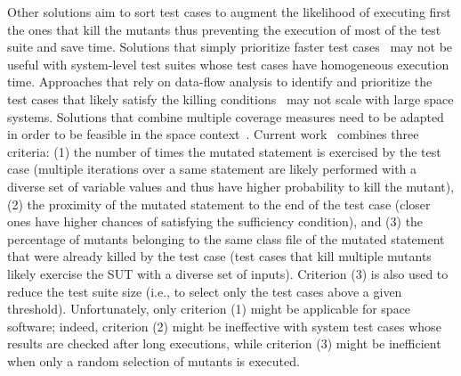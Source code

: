 Other solutions aim to sort test cases to augment the likelihood of executing first the ones that kill the mutants thus preventing the execution of most of the test suite and save time.
Solutions that simply prioritize faster test cases~\cite{just2012using}
 may not be useful with system-level test suites whose test cases have homogeneous execution time.
Approaches that rely on data-flow analysis to identify and prioritize the test cases that likely satisfy the killing conditions~\cite{papadakis2011automatically} may not scale with large space systems.
Solutions that combine multiple coverage measures need to be adapted in order 
to be feasible in the space context~\cite{zhang2013faster}.
Current work~\cite{zhang2013faster} combines three criteria: (1) the number of times the mutated statement is exercised by the test case (multiple iterations over a same statement are likely performed with a diverse set of variable values and thus have higher probability to kill the mutant), (2) the proximity of the mutated statement to the end of the test case (closer ones have higher chances of satisfying the sufficiency condition), and (3) the percentage of mutants belonging to the same class file of the mutated statement that were already killed by the test case (test cases that kill multiple mutants likely exercise the SUT with a diverse set of inputs). 
Criterion (3) is also used to reduce the test suite size (i.e., to select only the test cases above a given threshold). 
Unfortunately, only criterion (1) might be applicable for space software; indeed, criterion (2) might be ineffective with system test cases whose results are checked after long executions, while criterion (3) might be inefficient when only a random selection of mutants is executed. 






%
%
%




